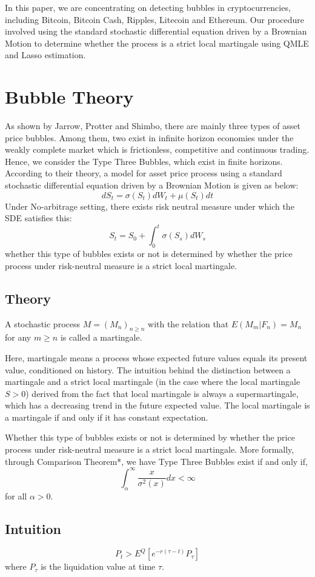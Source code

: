 \begin{spacing}{1.5}
In this paper, we are concentrating on detecting bubbles in cryptocurrencies, including Bitcoin, Bitcoin Cash, Ripples, Litecoin and Ethereum. Our procedure involved using the standard stochastic differential equation driven by a Brownian Motion to determine whether the process is a strict local martingale using QMLE and Lasso estimation.

\section{Bubble Theory}
As shown by Jarrow, Protter and Shimbo\cite{jarrow2011detect}, there are mainly three types of asset price bubbles. Among them, two exist in infinite horizon economies under the weakly complete market which is frictionless, competitive and continuous trading. Hence, we consider the Type Three Bubbles, which exist in finite horizons. According to their theory, a model for asset price process using a  standard stochastic differential equation driven by a Brownian Motion is given as below:
$$dS_t=\sigma(S_t)dW_t+\mu(S_t)dt$$
Under No-arbitrage setting, there exists risk neutral measure under which the SDE satisfies this:
$$S_t=S_0+\int_0^t\sigma(S_s)dW_s$$
whether this type of bubbles exists or not is determined by whether the price process under risk-neutral measure is a strict local martingale. 

\subsection{Theory}
A stochastic process $M = (M_n)_{n\ge n}$ with the relation that $E(M_m|F_n)=M_n$ for any $m\ge n$ is called a martingale.

Here, martingale means a process whose expected future values equals its present value, conditioned on history. The intuition behind the distinction between a martingale and a strict local martingale (in the case where the local martingale $S > 0$) derived from the fact that local martingale is always a supermartingale, which has a decreasing trend in the future expected value. The local martingale is a martingale if and only if it has constant expectation. 

Whether this type of bubbles exists or not is determined by whether the price process under risk-neutral measure is a strict local martingale. More formally, through Comparison Theorem*, we have Type Three Bubbles exist if and only if,
$$\int_{\alpha}^{\infty}\frac{x}{\sigma^2(x)}dx<\infty$$
for all $\alpha>0.$  
\subsection{Intuition}
$$
P_t > E^{Q}  [e^{-r (\tau - t)} P_{\tau} ]
$$
where $P_{\tau}$ is the liquidation value at time $\tau$.


\end{spacing}
